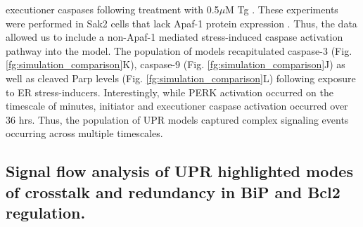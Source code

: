 \documentclass[fleqn,10pt]{wlscirep}
\begin{document}
executioner caspases following treatment with 0.5$\mu$M Tg \cite{rao2002cer}. These experiments were performed in Sak2 cells that lack Apaf-1 protein expression \cite{rao2002cer}. Thus, the data allowed us to include a non-Apaf-1 mediated stress-induced caspase activation pathway into the model. The population of models recapitulated caspase-3 (Fig. \ref{fg:simulation_comparison}K), caspase-9 (Fig. \ref{fg:simulation_comparison}J) as well as cleaved Parp levels (Fig. \ref{fg:simulation_comparison}L) following exposure to ER stress-inducers. Interestingly, while PERK activation occurred on the timescale of minutes, initiator and executioner caspase activation occurred over 36 hrs. Thus, the population of UPR models captured complex signaling events occurring across multiple timescales. 

\subsection*{Signal flow analysis of UPR highlighted modes of crosstalk and redundancy in BiP and Bcl2 regulation.}
\end{document}
